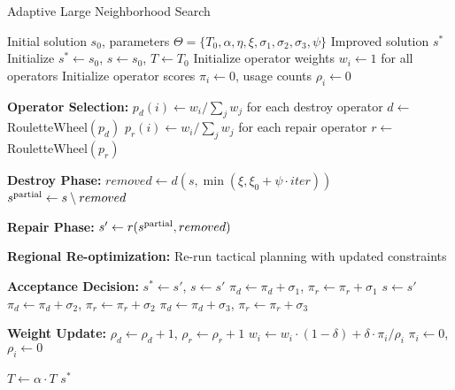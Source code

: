 \begin{algorithm}[htbp]
    \caption{Adaptive Large Neighborhood Search}
    \label{alg:alns}
    \begin{algorithmic}[1]
        \Require Initial solution $s_0$, parameters $\Theta = \{T_0, \alpha, \eta, \xi, \sigma_1, \sigma_2, \sigma_3, \psi\}$
        \Ensure Improved solution $s^*$
        \State Initialize $s^* \leftarrow s_0$, $s \leftarrow s_0$, $T \leftarrow T_0$
        \State Initialize operator weights $w_i \leftarrow 1$ for all operators
        \State Initialize operator scores $\pi_i \leftarrow 0$, usage counts $\rho_i \leftarrow 0$

        \State \textbf{Operator Selection:}
        \State $p_d(i) \leftarrow w_i / \sum_j w_j$ for each destroy operator
        \State $d \leftarrow$ RouletteWheel$(p_d)$
        \State $p_r(i) \leftarrow w_i / \sum_j w_j$ for each repair operator
        \State $r \leftarrow$ RouletteWheel$(p_r)$

        \State \textbf{Destroy Phase:}
        \State $removed \leftarrow d(s, \min(\xi, \xi_0 + \psi \cdot iter))$ 
        \State $s^{\text{partial}} \leftarrow s \setminus removed$

        \State \textbf{Repair Phase:}
        \State $s' \leftarrow r(s^{\text{partial}}, removed)$

        \State \textbf{Regional Re-optimization:}
        \State Re-run tactical planning with updated constraints
        \EndFor

        \State \textbf{Acceptance Decision:}
        \State $s^* \leftarrow s'$, $s \leftarrow s'$
        \State $\pi_d \leftarrow \pi_d + \sigma_1$, $\pi_r \leftarrow \pi_r + \sigma_1$
        \State $s \leftarrow s'$
        \State $\pi_d \leftarrow \pi_d + \sigma_2$, $\pi_r \leftarrow \pi_r + \sigma_2$
        \Else
        \State $\pi_d \leftarrow \pi_d + \sigma_3$, $\pi_r \leftarrow \pi_r + \sigma_3$
        \EndIf

        \State \textbf{Weight Update:}
        \State $\rho_d \leftarrow \rho_d + 1$, $\rho_r \leftarrow \rho_r + 1$
        \State $w_i \leftarrow w_i \cdot (1 - \delta) + \delta \cdot \pi_i / \rho_i$
        \State $\pi_i \leftarrow 0$, $\rho_i \leftarrow 0$
        \EndFor
        \EndIf

        \State $T \leftarrow \alpha \cdot T$ 
        \EndFor
        \State \Return $s^*$
    \end{algorithmic}
\end{algorithm}

